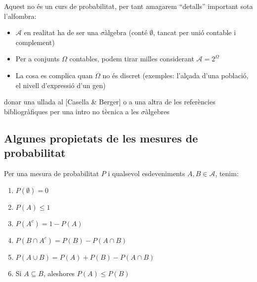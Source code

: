 \documentclass[letterpaper,10pt,english]{sphinxmanual}
\begin{document}
Aquest no és un curs de probabilitat, per tant amagarem “detalls” important sota l’alfombra:
\begin{itemize}
\item {} 
\(\mathcal{A}\) en realitat ha de ser una \(\sigma\)\sphinxhyphen{}àlgebra (conté \(\emptyset\), tancat per unió contable i complement)

\item {} 
Per a conjunts \(\Omega\) contables, podem tirar milles considerant \(\mathcal{A} = 2^{\Omega}\)

\item {} 
La cosa es complica quan \(\Omega\) no és discret (exemples: l’alçada d’una població, el nivell d’expressió d’un gen)

\end{itemize}

 donar una ullada al {[}Casella \& Berger{]} o a una altra de les referències
bibliogràfiques per una intro no tècnica a les \(\sigma\)\sphinxhyphen{}àlgebres


\subsection{Algunes propietats de les mesures de probabilitat}
\label{\detokenize{0_Intro/0_1_Repas_probabilitat:algunes-propietats-de-les-mesures-de-probabilitat}}
 Per una mesura de probabilitat \(P\) i
qualsevol esdeveniments \(A, B \in \mathcal{A}\), tenim:
\begin{enumerate}
%
\item {} 
\(P\left(\emptyset\right)=0\)

\item {} 
\(P\left(A\right) \leq 1\)

\item {} 
\(P\left(A^c\right) = 1 - P\left(A\right)\)

\item {} 
\(P\left(B \cap A^c\right) = P\left(B\right) - P\left(A \cap B\right)\)

\item {} 
\(P\left(A \cup B\right) = P\left(A\right) + P\left(B\right) - P\left(A \cap B\right)\)

\item {} 
Si \(A \subseteq B\), aleshores \(P\left(A\right) \leq P\left(B\right)\)

\end{enumerate}
\end{document}
